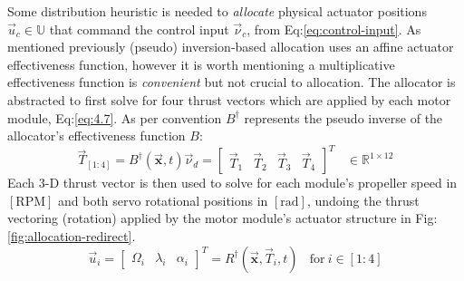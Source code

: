 \par
Some distribution heuristic is needed to \emph{allocate} physical actuator positions $\vec{u}_c\in\mathbb{U}$ that command the control input $\vec{\nu}_c$, from Eq:\ref{eq:control-input}. As mentioned previously (pseudo) inversion-based allocation uses an affine actuator effectiveness function, however it is worth mentioning a multiplicative effectiveness function is \emph{convenient} but not crucial to allocation. The allocator is abstracted to first solve for four thrust vectors which are applied by each motor module, Eq:\ref{eq:4.7}. As per convention $B^\dagger$ represents the pseudo inverse of the allocator's effectiveness function $B$:
\begin{equation}\label{eq:5.1}
\vec{T}_{[1:4]}=B^{\dagger}(\vec{\mathbf{x}},t)\vec{\nu}_d=\begin{bmatrix}
\vec{T}_1&\vec{T}_2&\vec{T}_3&\vec{T}_4
\end{bmatrix}^T~~~~\in\mathbb{R}^{1\times 12}
\end{equation}
Each 3-D thrust vector is then used to solve for each module's propeller speed in $[\text{RPM}]$ and both servo rotational positions in $[\text{rad}]$, undoing the thrust vectoring (rotation) applied by the motor module's actuator structure in Fig:\ref{fig:allocation-redirect}.
\begin{equation}
\vec{u}_i = \begin{bmatrix}\Omega_i&\lambda_i&\alpha_i\end{bmatrix}^T=R^\dagger(\vec{\mathbf{x}},\vec{T}_i,t)~~~~\text{for}~i\in[1:4]
\end{equation}
